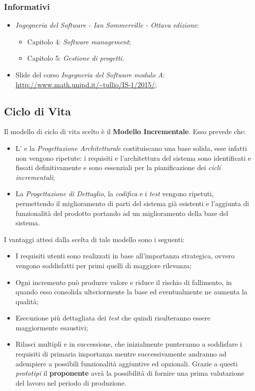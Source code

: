 \subsubsection{Informativi}
	\begin{itemize}
		\item \textit{Ingegneria del Software - Ian Sommerville - Ottava edizione}:
		\begin{itemize}
			\item Capitolo 4: \textit{Software management};
			\item Capitolo 5: \textit{Gestione di progetti}.
		\end{itemize}
		\item Slide del corso \textit{Ingegneria del Software modulo A}:\\
		\url{http://www.math.unipd.it/~tullio/IS-1/2015/};
	\end{itemize}
\subsection{Ciclo di Vita}
Il modello di ciclo di vita scelto è il \textbf{Modello Incrementale}. Esso prevede che:
\begin{itemize}
	\item L'\textit{\AdR} e la \textit{Progettazione Architetturale} costituiscano una base solida, esse infatti non vengono ripetute: i requisiti e l'architettura del sistema sono identificati e fissati definitivamente e sono essenziali per la pianificazione dei \textit{cicli incrementali};
	\item La \textit{Progettazione di Dettaglio}, la \textit{codifica} e i \textit{test} vengono ripetuti, permettendo il miglioramento di parti del sistema già esistenti e l'aggiunta di funzionalità del prodotto portando ad un miglioramento della base del sistema.
\end{itemize}
I vantaggi attesi dalla scelta di tale modello sono i seguenti:
\begin{itemize}
	\item I requisiti utenti sono realizzati in base all'importanza strategica, ovvero vengono soddisfatti per primi quelli di maggiore rilevanza;
	\item Ogni incremento può produrre valore e riduce il rischio di fallimento, in quando esso consolida ulteriormente la base ed eventualmente ne aumenta la qualità;
	\item Esecuzione più dettagliata dei \textit{test} che quindi risulteranno essere maggiormente esaustivi;
	\item Rilasci multipli e in successione, che inizialmente punteranno a soddisfare i requisiti di primaria importanza mentre successivamente andranno ad adempiere a possibili funzionalità aggiuntive ed opzionali. Grazie a questi \textit{prototipi} il \textbf{proponente} avrà la possibilità di fornire una prima valutazione del lavoro nel periodo di produzione.
\end{itemize}
